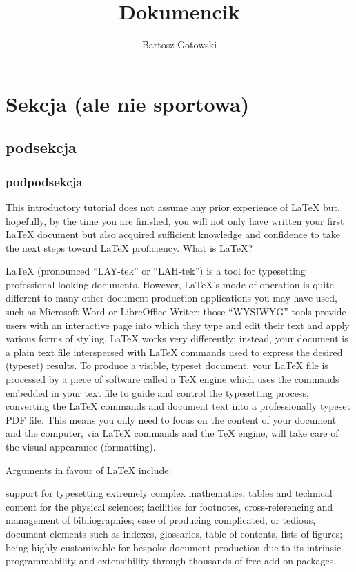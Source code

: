 \documentclass{article}
\title{Dokumencik}
\author{Bartosz Gotowski}
\begin{document}
\maketitle

\tableofcontents

\section{Sekcja (ale nie sportowa)}

\subsection{podsekcja}

\subsubsection{podpodsekcja}

This introductory tutorial does not assume any prior experience of LaTeX but, hopefully, by the time you are finished, you will not only have written your first LaTeX document but also acquired sufficient knowledge and confidence to take the next steps toward LaTeX proficiency.
What is LaTeX?

LaTeX (pronounced “LAY-tek” or “LAH-tek”) is a tool for typesetting professional-looking documents. However, LaTeX’s mode of operation is quite different to many other document-production applications you may have used, such as Microsoft Word or LibreOffice Writer: those “WYSIWYG” tools provide users with an interactive page into which they type and edit their text and apply various forms of styling. LaTeX works very differently: instead, your document is a plain text file interspersed with LaTeX commands used to express the desired (typeset) results. To produce a visible, typeset document, your LaTeX file is processed by a piece of software called a TeX engine which uses the commands embedded in your text file to guide and control the typesetting process, converting the LaTeX commands and document text into a professionally typeset PDF file. This means you only need to focus on the content of your document and the computer, via LaTeX commands and the TeX engine, will take care of the visual appearance (formatting).

Arguments in favour of LaTeX include:

    support for typesetting extremely complex mathematics, tables and technical content for the physical sciences;
    facilities for footnotes, cross-referencing and management of bibliographies;
    ease of producing complicated, or tedious, document elements such as indexes, glossaries, table of contents, lists of figures;
    being highly customizable for bespoke document production due to its intrinsic programmability and extensibility through thousands of free add-on packages.
\end{document}
